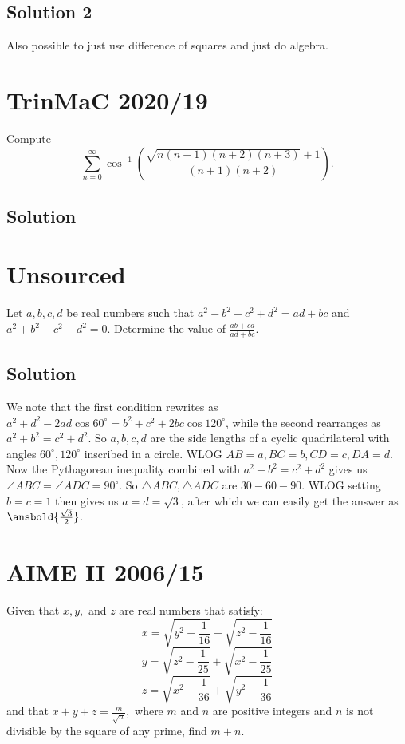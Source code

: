 \documentclass{article}
\begin{document}
\subsection{Solution 2}
Also possible to just use difference of squares and just do algebra.

\pagebreak\section{TrinMaC 2020/19}
Compute
\[\sum_{n=0}^{\infty}\cos^{-1}\left(\frac{\sqrt{n(n+1)(n+2)(n+3)}+1}{(n+1)(n+2)}\right).\]

\subsection{Solution}

\pagebreak\section{Unsourced}
Let $a,b,c,d$ be real numbers such that $a^2 - b^2 - c^2 + d^2 = ad + bc$ and $a^2 + b^2 - c^2 - d^2 = 0.$ Determine the value of $\frac{ab + cd}{ad + bc}.$

\subsection{Solution}
We note that the first condition rewrites as $a^2+d^2-2ad\cos 60^\circ=b^2+c^2+2bc\cos 120^\circ$, while the second rearranges as $a^2+b^2=c^2+d^2$. So $a,b,c,d$ are the side lengths of a cyclic quadrilateral with angles $60^\circ,120^\circ$ inscribed in a circle. WLOG $AB=a,BC=b,CD=c,DA=d$. Now the Pythagorean inequality combined with $a^2+b^2=c^2+d^2$ gives us $\angle ABC=\angle ADC=90^\circ$. So $\triangle ABC,\triangle ADC$ are $30-60-90$. WLOG setting $b=c=1$ then gives us $a=d=\sqrt{3}$, after which we can easily get the answer as $\ansbold{\frac{\sqrt{3}}{2}}$.

\pagebreak\section{AIME II 2006/15}
Given that $x, y,$ and $z$ are real numbers that satisfy:
\[x = \sqrt{y^2-\frac{1}{16}}+\sqrt{z^2-\frac{1}{16}}\]
\[y = \sqrt{z^2-\frac{1}{25}}+\sqrt{x^2-\frac{1}{25}}\]
\[z = \sqrt{x^2-\frac{1}{36}}+\sqrt{y^2-\frac{1}{36}}\]
and that $x+y+z = \frac{m}{\sqrt{n}},$ where $m$ and $n$ are positive integers and $n$ is not divisible by the square of any prime, find $m+n.$
\end{document}
